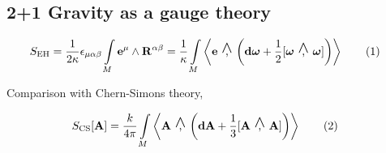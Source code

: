\documentclass[a0,portrait]{a0poster}
\newcommand{\wedgecomma}{\stackon[1pt]{,}{\smash{\scriptsize$\wedge$}}}
\newcommand{\wedgecomm}[2]{\qty[ #1\ \wedgecomma\ #2 ]}
\newcommand\numberthis{\addtocounter{equation}{1}\tag{\theequation}}
\begin{document}
\begin{multicols}{2}




\section*{2+1 Gravity as a gauge theory}

\begin{align}
    S_{\textnormal{EH}}&=\frac{1}{2\kappa}\epsilon_{\mu\alpha\beta}\int\limits_M\vb e^\mu\wedge \vb R^{\alpha\beta}=\frac{1}{\kappa}\int\limits_M\expval{\vb e\ \wedgecomma\ \qty(\vb d{\boldsymbol\omega}+\frac12\wedgecomm{\boldsymbol\omega}{\boldsymbol\omega})}\numberthis\label{EHAction4}
\end{align}

Comparison with Chern-Simons theory,

\begin{align}
    S_{\textnormal{CS}}\qty[\vb A]&=\frac{k}{4\pi}\int\limits_M\expval{\vb A\ \wedgecomma\ \qty(\vb d{\vb A}+\frac13\wedgecomm{\vb A}{\vb A})}\numberthis\label{YangMillsAction}
\end{align}


\end{multicols}
\end{document}
